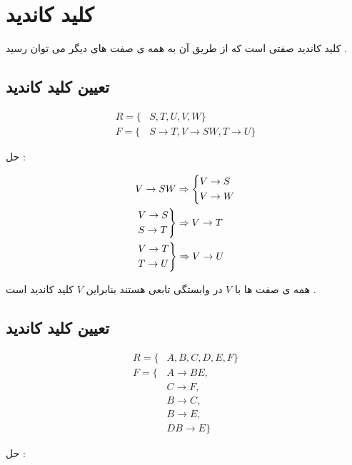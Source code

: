 \documentclass{article}
\begin{document}
\section{کلید کاندید}
کلید کاندید صفتی است که از طریق آن به همه ی صفت های دیگر می توان رسید .


\subsection{تعیین کلید کاندید }


\begin{align*}
R = \{ &S , T , U , V , W \}  \\
F = \{ &S \to T , 
V \to SW , 
T \to U \}
\end{align*}

حل :


\begin{align*}
&V \to SW \Rightarrow  \begin{cases*}  V \to S \\ V \to W \end{cases*} \\ 
& \begin{rcases*} V \to S \\ S \to T \end{rcases*} \Rightarrow V \to T \\
&\begin{rcases*} V \to T \\ T \to U \end{rcases*} \Rightarrow V \to U \\
\end{align*}


همه ی صفت ها با $V$  در وابستگی تابعی هستند بنابراین $V$  کلید کاندید است .


\subsection{تعیین کلید کاندید }


\begin{align*}
R = \{ &A , B , C , D , E , F \}  \\
F = \{ &A \to BE , \\
&C \to F , \\
&B \to C , \\
&B \to E , \\
&DB \to E \}
\end{align*}

حل :
\end{document}
